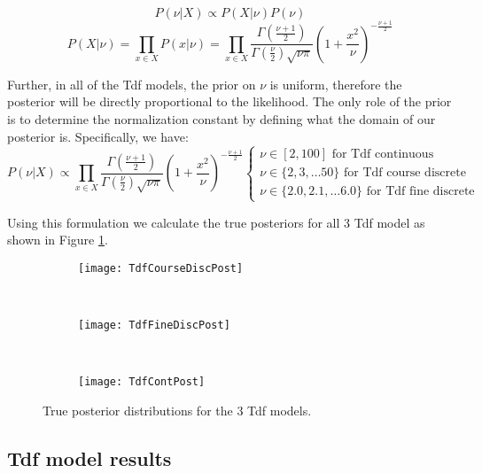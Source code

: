 \[P(\nu|X) \propto P(X|\nu)P(\nu)\]
\[P(X|\nu) = \prod_{x \in X} P(x|\nu) = \prod_{x \in X} \frac{\Gamma \left( \frac{\nu+1}{2} \right)}{\Gamma \left( \frac{\nu}{2} \right) \sqrt{\nu \pi}} \left( 1 + \frac{x^2}{\nu} \right)^{-\frac{\nu+1}{2}} \]

Further, in all of the Tdf models, the prior on $\nu$ is uniform, therefore the posterior will be directly proportional to the likelihood. The only role of the prior is to determine the normalization constant by defining what the domain of our posterior is. Specifically, we have:
\[P(\nu|X) \propto 
  \prod_{x \in X} \frac{\Gamma \left( \frac{\nu+1}{2} \right)}{\Gamma \left( \frac{\nu}{2} \right) \sqrt{\nu \pi}} \left( 1 + \frac{x^2}{\nu} \right)^{-\frac{\nu+1}{2}}
  \left\{
	  \begin{array}{lll}
		  \nu \in [2,100] \mbox{ for Tdf continuous} \\
		  \nu \in \{2, 3, \ldots 50\} \mbox{ for Tdf course discrete} \\
      \nu \in \{2.0, 2.1, \ldots 6.0\} \mbox{ for Tdf fine discrete}
	  \end{array}
  \right.\]

Using this formulation we calculate the true posteriors for all 3 Tdf model as shown in Figure \ref{fig:tdfPosts}.

\begin{figure}[h]
        \centering
        \begin{subfigure}[b]{0.31\textwidth}
                \centering
                \texttt{[image: TdfCourseDiscPost]}
        \end{subfigure}
        ~ 
        \begin{subfigure}[b]{0.31\textwidth}
                \centering
                \texttt{[image: TdfFineDiscPost]}
        \end{subfigure}
        ~ 
        \begin{subfigure}[b]{0.31\textwidth}
                \centering
                \texttt{[image: TdfContPost]}
        \end{subfigure}
    \caption{True posterior distributions for the 3 Tdf models.}
    \label{fig:tdfPosts}
\end{figure}

\subsection{Tdf model results}

